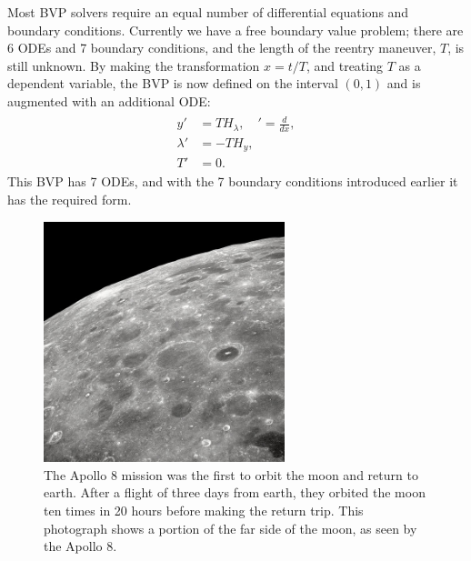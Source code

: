 Most BVP solvers require an equal number of differential equations and boundary conditions. 
Currently we have a free boundary value problem; there are 6 ODEs and 7 boundary conditions, and the length of the reentry maneuver, $T$, is still unknown. 
By making the transformation $x = t/T$, and treating $T$ as a dependent variable, the BVP is now defined on the interval $(0,1)$ and is augmented with an additional ODE: 
\begin{align}
\begin{split}
	y' &= TH_{\lambda},\quad ' = \frac{d}{dx},\\
	\lambda' &= -TH_{y},\\
	T' &= 0. \label{eqn:reentry:full_system}
\end{split}	
\end{align}
This BVP has 7 ODEs, and with the 7 boundary conditions introduced earlier it has the required form.


\begin{figure}
\centering
\includegraphics[width=7cm]{The_Lunar_Farside.jpg}
\caption{ The Apollo 8 mission was the first to orbit the moon and return to earth. 
After a flight of three days from earth, they orbited the moon ten times in 20 hours before making the return trip. 
This photograph  shows a portion of the far side of the moon, as seen by the Apollo 8.
}
\label{fig:reentry:Lunar_Farside}
\end{figure}



